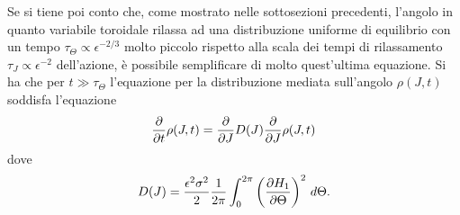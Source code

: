 \documentclass[10pt,a4paper]{article}
\begin{document}
Se si tiene poi conto che, come mostrato nelle sottosezioni precedenti, l'angolo in quanto variabile toroidale rilassa ad una distribuzione uniforme di equilibrio con un tempo $\tau_{\Theta} \propto \epsilon^{-2/3}$ molto piccolo rispetto alla scala dei tempi di rilassamento $\tau_{J} \propto \epsilon^{-2}$ dell'azione, è possibile semplificare di molto quest'ultima equazione. Si ha che per $t\gg\tau_{\Theta}$ l'equazione per la distribuzione mediata sull'angolo $\rho(J,t)$ soddisfa l'equazione
\begin{equation}
	\pdv{}{t}\rho(J,t) = \pdv{}{J}D(J)\pdv{}{J}\rho(J,t)
\end{equation}
dove
\begin{equation}
	D(J) = \frac{\epsilon^2 \sigma^2}{2}\frac{1}{2\pi}\int_0^{2\pi}\left(\pdv{H_1}{\Theta}\right)^2 \,d\Theta.
\end{equation}
\end{document}
